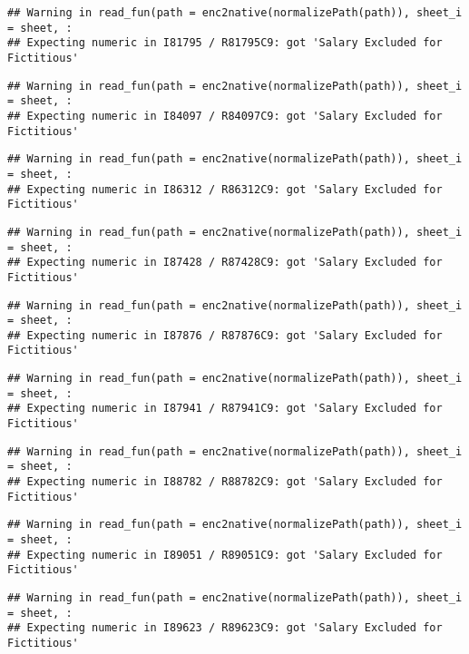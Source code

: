 \documentclass[
]{article}
\begin{document}
\begin{verbatim}
## Warning in read_fun(path = enc2native(normalizePath(path)), sheet_i = sheet, :
## Expecting numeric in I81795 / R81795C9: got 'Salary Excluded for Fictitious'
\end{verbatim}

\begin{verbatim}
## Warning in read_fun(path = enc2native(normalizePath(path)), sheet_i = sheet, :
## Expecting numeric in I84097 / R84097C9: got 'Salary Excluded for Fictitious'
\end{verbatim}

\begin{verbatim}
## Warning in read_fun(path = enc2native(normalizePath(path)), sheet_i = sheet, :
## Expecting numeric in I86312 / R86312C9: got 'Salary Excluded for Fictitious'
\end{verbatim}

\begin{verbatim}
## Warning in read_fun(path = enc2native(normalizePath(path)), sheet_i = sheet, :
## Expecting numeric in I87428 / R87428C9: got 'Salary Excluded for Fictitious'
\end{verbatim}

\begin{verbatim}
## Warning in read_fun(path = enc2native(normalizePath(path)), sheet_i = sheet, :
## Expecting numeric in I87876 / R87876C9: got 'Salary Excluded for Fictitious'
\end{verbatim}

\begin{verbatim}
## Warning in read_fun(path = enc2native(normalizePath(path)), sheet_i = sheet, :
## Expecting numeric in I87941 / R87941C9: got 'Salary Excluded for Fictitious'
\end{verbatim}

\begin{verbatim}
## Warning in read_fun(path = enc2native(normalizePath(path)), sheet_i = sheet, :
## Expecting numeric in I88782 / R88782C9: got 'Salary Excluded for Fictitious'
\end{verbatim}

\begin{verbatim}
## Warning in read_fun(path = enc2native(normalizePath(path)), sheet_i = sheet, :
## Expecting numeric in I89051 / R89051C9: got 'Salary Excluded for Fictitious'
\end{verbatim}

\begin{verbatim}
## Warning in read_fun(path = enc2native(normalizePath(path)), sheet_i = sheet, :
## Expecting numeric in I89623 / R89623C9: got 'Salary Excluded for Fictitious'
\end{verbatim}
\end{document}
